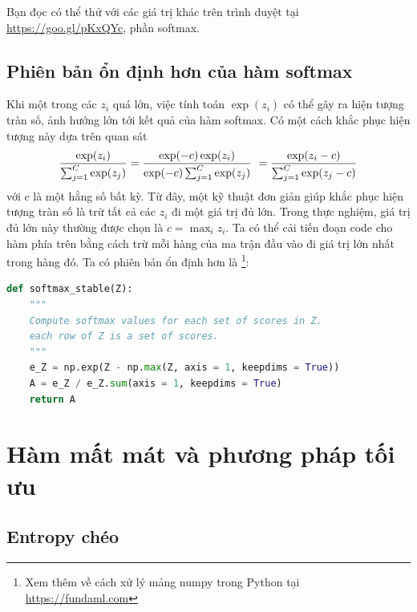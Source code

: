 Bạn đọc có thể thử với các giá trị khác trên trình duyệt tại
\url{https://goo.gl/pKxQYc}, phần softmax.


\subsection{Phiên bản ổn định hơn của hàm softmax}
Khi một trong các $z_i$ quá lớn, việc tính toán $\exp(z_i)$ có thể gây ra hiện
tượng tràn số, ảnh hưởng lớn tới kết quả của hàm
softmax. Có một cách khắc phục hiện tượng này dựa trên quan sát
\begin{equation}
\frac{\exp(z_i)}{\sum_{j=1}^C \exp(z_j)} = \frac{\exp(-c)\exp(z_i)}{\exp(-c)\sum_{j=1}^C \exp(z_j)}\\\
= \frac{\exp(z_i-c)}{\sum_{j=1}^C \exp(z_j-c)}
\end{equation}
với $c$ là một hằng số bất kỳ. Từ đây, một kỹ thuật đơn giản giúp khắc phục hiện
tượng tràn số là trừ tất cả các $z_i$ đi một giá trị đủ lớn. Trong thực nghiệm,
giá trị đủ lớn này thường được chọn là $c = \max_i z_i$. Ta có thể cải tiến
đoạn code cho hàm \pythoninline{softmax} phía trên bằng cách trừ mỗi hàng của
ma trận đầu vào \pythoninline{Z} đi giá trị lớn nhất trong hàng đó. Ta có phiên
bản ổn định hơn là \pythoninline{softmax_stable}\footnote{Xem thêm về
cách xử lý mảng numpy trong Python tại \url{https://fundaml.com}}:
\begin{lstlisting}[language=Python]
def softmax_stable(Z):
    """
    Compute softmax values for each set of scores in Z.
    each row of Z is a set of scores.
    """
    e_Z = np.exp(Z - np.max(Z, axis = 1, keepdims = True))
    A = e_Z / e_Z.sum(axis = 1, keepdims = True)
    return A
\end{lstlisting}






\section{Hàm mất mát và phương pháp tối ưu }


\subsection{Entropy chéo}

